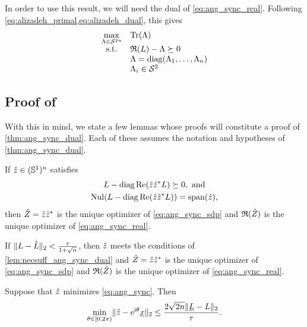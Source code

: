 In order to use this result, we will need the dual of \eqref{eq:ang_sync_real}.  Following \cref{eq:alizadeh_primal,eq:alizadeh_dual}, this gives
\begin{equation}
  \begin{array}{cl}
    \max\limits_{\Lambda \in \mathcal{S}^{2n}} & \operatorname{Tr}(\Lambda) \\
    \text{s.t.} & \mathfrak{R}(L) - \Lambda \succeq 0 \\
    & \Lambda = \operatorname{diag}(\Lambda_1, \ldots, \Lambda_n) \\
    & \Lambda_i \in \mathcal{S}^2
  \end{array} \label{eq:ang_sync_real_dual}
\end{equation}

\subsection{Proof of }
With this in mind, we state a few lemmas whose proofs will constitute a proof of \cref{thm:ang_sync_dual}.  Each of these assumes the notation and hypotheses of \cref{thm:ang_sync_dual}.

\begin{lemma}
  If $\hat{z} \in (\mathbb{S}^1)^n$ satisfies \begin{gather} L - \operatorname{diag}\operatorname{Re}(\hat{z} \hat{z}^* L) \succeq 0, \ \text{and} \label{eq:ang_sync_certificate} \\ \operatorname{Nul}(L - \operatorname{diag}\operatorname{Re}(\hat{z} \hat{z}^* L)) = \operatorname{span}(\hat{z}), \label{eq:ang_sync_nullspace} \end{gather} then $\hat{Z} = \hat{z} \hat{z}^*$ is the unique optimizer of \eqref{eq:ang_sync_sdp} and $\mathfrak{R}(\hat{Z})$ is the unique optimizer of \eqref{eq:ang_sync_real}.
  \label{lem:necsuff_ang_sync_dual}
\end{lemma}

\begin{lemma}
  If $\lVert L - \hat{L}\rVert_2 < \frac{\tau}{1 + \sqrt{n}}$, then $\hat{z}$ meets the conditions of \cref{lem:necsuff_ang_sync_dual} and $\hat{Z} = \hat{z} \hat{z}^*$ is the unique optimizer of \eqref{eq:ang_sync_sdp} and $\mathfrak{R}(\hat{Z})$ is the unique optimizer of \eqref{eq:ang_sync_real}.
  \label{lem:unique_ang_sync}
\end{lemma}

\begin{lemma}
  Suppose that $\hat{z}$ minimizes \eqref{eq:ang_sync}.  Then \[\min_{\theta \in [0, 2\pi)} \lVert \hat{z} - \mathrm{e}^{\mathrm{i} \theta} \underline{x} \rVert_2 \le \dfrac{2 \sqrt{2 n} \lVert\underline{L} - L\rVert_2}{\tau}.\]
    \label{lem:error_ang_sync}
\end{lemma}

